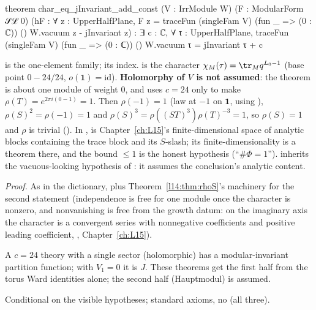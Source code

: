 \begin{leancode}
theorem char_eq_jInvariant_add_const (V : IrrModule W) (F : ModularForm 𝒮ℒ 0)
    (hF : ∀ z : UpperHalfPlane,
      F z = traceFun (singleFam V) (fun _ => (0 : ℂ)) () W.vacuum z - jInvariant z) :
    ∃ c : ℂ, ∀ τ : UpperHalfPlane,
      traceFun (singleFam V) (fun _ => (0 : ℂ)) () W.vacuum τ = jInvariant τ + c
\end{leancode}
\begin{dictionary}
 is the one-element family; \lean{()} its index.  is the
character $\chi_M(\tau) = \tr_Mq^{L_0-1}$ (base point $0 - 24/24$, $o(\mathbf 1) = \mathrm{id}$). \textbf{Holomorphy of $V$ is not
assumed}: the theorem is about one module of weight $0$, and uses $c = 24$ only to make $\rho(T) = e^{2\pi i(0-1)} = 1$. Then
$\rho(-1) = 1$ (law at $-1$ on $\mathbf 1$, using ), $\rho(S)^2 = \rho(-1) = 1$ and $\rho(S)^3 = \rho((ST)^3)\rho(T)^{-3} =
1$, so $\rho(S) = 1$ and $\rho$ is trivial (). In
,  is Chapter~\ref{ch:L15}'s finite-dimensional space of
analytic blocks containing the trace block and its $S$-slash; its finite-dimensionality is a theorem there, and the bound
$\le1$ is the honest hypothesis (``$\#\Phi = 1$'').  inherits the vacuous-looking hypothesis
of : it assumes the conclusion's analytic content.
\end{dictionary}
\noindent\emph{Proof.} As in the dictionary, plus Theorem~\ref{l14:thm:rhoS}'s machinery for the second statement (independence
is free for one module once the character is nonzero, and nonvanishing is free from the growth datum: on the imaginary axis the character is a convergent series with
nonnegative coefficients and positive leading coefficient, , Chapter~\ref{ch:L15}).
\begin{physics}
A $c=24$ theory with a single sector (holomorphic) has a modular-invariant partition function; with $V_1 = 0$ it is $J$. These
theorems get the first half from the torus Ward identities alone; the second half (Hauptmodul) is assumed.
\end{physics}
\begin{status}
Conditional on the visible hypotheses; standard axioms, no  (all three).
\end{status}
